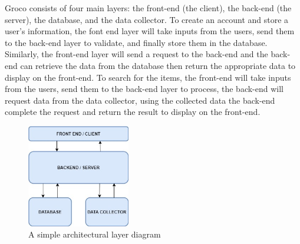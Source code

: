 Groco consists of four main layers: the front-end (the client), the back-end (the server), the database, and the data collector. To create an account and store a user's information, the font end layer will take inputs from the users, send them to the back-end layer to validate, and finally store them in the database. Similarly, the front-end layer will send a request to the back-end and the back-end can retrieve the data from the database then return the appropriate data to display on the front-end. To search for the items, the front-end will take inputs from the users, send them to the back-end layer to process, the back-end will request data from the data collector, using the collected data the back-end complete the request and return the result to display on the front-end. 

\begin{figure}[h!]
	\centering
 	\includegraphics[width=0.4\textwidth]{images/ADS_overview.jpg}
 \caption{A simple architectural layer diagram}
\end{figure}

